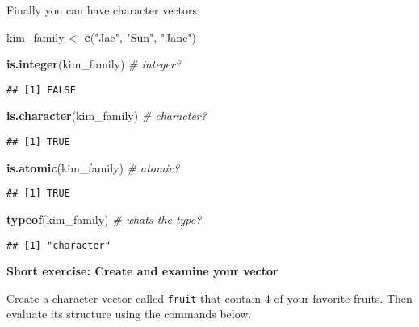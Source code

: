 \documentclass[
]{book}
\newenvironment{Shaded}{\begin{snugshade}}{\end{snugshade}}
\newcommand{\CommentTok}[1]{\textcolor[rgb]{0.56,0.35,0.01}{\textit{#1}}}
\newcommand{\KeywordTok}[1]{\textcolor[rgb]{0.13,0.29,0.53}{\textbf{#1}}}
\newcommand{\NormalTok}[1]{#1}
\newcommand{\StringTok}[1]{\textcolor[rgb]{0.31,0.60,0.02}{#1}}
\begin{document}
Finally you can have character vectors:

\begin{Shaded}
\begin{Highlighting}[]
\NormalTok{kim\_family \textless{}{-}}\StringTok{ }\KeywordTok{c}\NormalTok{(}\StringTok{"Jae"}\NormalTok{, }\StringTok{"Sun"}\NormalTok{, }\StringTok{"Jane"}\NormalTok{)}

\KeywordTok{is.integer}\NormalTok{(kim\_family) }\CommentTok{\# integer?}
\end{Highlighting}
\end{Shaded}

\begin{verbatim}
## [1] FALSE
\end{verbatim}

\begin{Shaded}
\begin{Highlighting}[]
\KeywordTok{is.character}\NormalTok{(kim\_family) }\CommentTok{\# character?}
\end{Highlighting}
\end{Shaded}

\begin{verbatim}
## [1] TRUE
\end{verbatim}

\begin{Shaded}
\begin{Highlighting}[]
\KeywordTok{is.atomic}\NormalTok{(kim\_family) }\CommentTok{\# atomic?}
\end{Highlighting}
\end{Shaded}

\begin{verbatim}
## [1] TRUE
\end{verbatim}

\begin{Shaded}
\begin{Highlighting}[]
\KeywordTok{typeof}\NormalTok{(kim\_family) }\CommentTok{\# what\textquotesingle{}s the type?}
\end{Highlighting}
\end{Shaded}

\begin{verbatim}
## [1] "character"
\end{verbatim}

\textbf{Short exercise: Create and examine your vector}

Create a character vector called \texttt{fruit} that contain 4 of your favorite fruits. Then evaluate its structure using the commands below.
\end{document}
